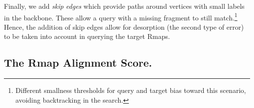 
Finally, we add {\em skip edges} which provide paths around vertices with small labels in the backbone.
These allow a query with a missing fragment to still match.\footnote{Different smallness thresholds for query and target bias toward this scenario, avoiding backtracking in the search.}  Hence, the addition of skip edges allow for desorption (the second type of error) to be taken into account in querying the target Rmaps.  



\subsection{The Rmap Alignment Score.}


